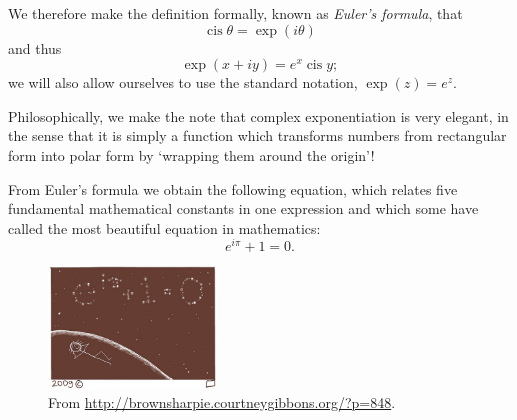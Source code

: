\documentclass[a4paper,10pt,titlepage]{article}
\theoremstyle{definition}
\DeclareMathOperator{\cis}{cis}
\begin{document}
We therefore make the definition formally, known as \emph{Euler's formula}, that
\begin{displaymath}
  \cis \theta = \exp(i\theta)
\end{displaymath}
and thus
\begin{displaymath}
  \exp(x + iy) = e^x \cis y;
\end{displaymath}
we will also allow ourselves to use the standard notation, $ \exp(z) = e^z $.

Philosophically, we make the note that complex exponentiation is very elegant, in the sense that it
is simply a function which transforms numbers from rectangular form into polar form by `wrapping them
around the origin'!

From Euler's formula we obtain the following equation, which relates five fundamental mathematical constants
in one expression and which some have called the most beautiful equation in mathematics:
\begin{equation}
  \tag{Euler's Identity}
  e^{i\pi} + 1 = 0.
\end{equation}

\begin{figure}
  \centering
  \includegraphics[width=0.4\textwidth]{stars}
  \caption{From \url{http://brownsharpie.courtneygibbons.org/?p=848}.}
\end{figure}
\end{document}
